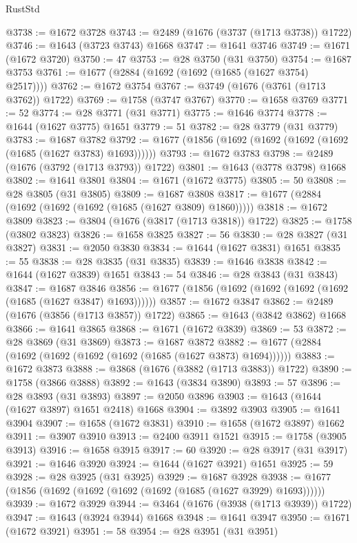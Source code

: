 \begin{lexlean}{RustStd}
\begin{coremodule}
@3738 := @1672 @3728
@3743 := @2489 (@1676 (@3737 (@1713 @3738)) @1722)
@3746 := @1643 (@3723 @3743) @1668
@3747 := @1641 @3746
@3749 := @1671 (@1672 @3720)
@3750 := 47
@3753 := @28 @3750 (@31 @3750)
@3754 := @1687 @3753
@3761 := @1677 (@2884 (@1692 (@1692 (@1685 (@1627 @3754) @2517))))
@3762 := @1672 @3754
@3767 := @3749 (@1676 (@3761 (@1713 @3762)) @1722)
@3769 := @1758 (@3747 @3767)
@3770 := @1658 @3769
@3771 := 52
@3774 := @28 @3771 (@31 @3771)
@3775 := @1646 @3774
@3778 := @1644 (@1627 @3775) @1651
@3779 := 51
@3782 := @28 @3779 (@31 @3779)
@3783 := @1687 @3782
@3792 := @1677 (@1856 (@1692 (@1692 (@1692 (@1692 (@1685 (@1627 @3783) @1693))))))
@3793 := @1672 @3783
@3798 := @2489 (@1676 (@3792 (@1713 @3793)) @1722)
@3801 := @1643 (@3778 @3798) @1668
@3802 := @1641 @3801
@3804 := @1671 (@1672 @3775)
@3805 := 50
@3808 := @28 @3805 (@31 @3805)
@3809 := @1687 @3808
@3817 := @1677 (@2884 (@1692 (@1692 (@1692 (@1685 (@1627 @3809) @1860)))))
@3818 := @1672 @3809
@3823 := @3804 (@1676 (@3817 (@1713 @3818)) @1722)
@3825 := @1758 (@3802 @3823)
@3826 := @1658 @3825
@3827 := 56
@3830 := @28 @3827 (@31 @3827)
@3831 := @2050 @3830
@3834 := @1644 (@1627 @3831) @1651
@3835 := 55
@3838 := @28 @3835 (@31 @3835)
@3839 := @1646 @3838
@3842 := @1644 (@1627 @3839) @1651
@3843 := 54
@3846 := @28 @3843 (@31 @3843)
@3847 := @1687 @3846
@3856 := @1677 (@1856 (@1692 (@1692 (@1692 (@1692 (@1685 (@1627 @3847) @1693))))))
@3857 := @1672 @3847
@3862 := @2489 (@1676 (@3856 (@1713 @3857)) @1722)
@3865 := @1643 (@3842 @3862) @1668
@3866 := @1641 @3865
@3868 := @1671 (@1672 @3839)
@3869 := 53
@3872 := @28 @3869 (@31 @3869)
@3873 := @1687 @3872
@3882 := @1677 (@2884 (@1692 (@1692 (@1692 (@1692 (@1685 (@1627 @3873) @1694))))))
@3883 := @1672 @3873
@3888 := @3868 (@1676 (@3882 (@1713 @3883)) @1722)
@3890 := @1758 (@3866 @3888)
@3892 := @1643 (@3834 @3890)
@3893 := 57
@3896 := @28 @3893 (@31 @3893)
@3897 := @2050 @3896
@3903 := @1643 (@1644 (@1627 @3897) @1651 @2418) @1668
@3904 := @3892 @3903
@3905 := @1641 @3904
@3907 := @1658 (@1672 @3831)
@3910 := @1658 (@1672 @3897) @1662
@3911 := @3907 @3910
@3913 := @2400 @3911 @1521
@3915 := @1758 (@3905 @3913)
@3916 := @1658 @3915
@3917 := 60
@3920 := @28 @3917 (@31 @3917)
@3921 := @1646 @3920
@3924 := @1644 (@1627 @3921) @1651
@3925 := 59
@3928 := @28 @3925 (@31 @3925)
@3929 := @1687 @3928
@3938 := @1677 (@1856 (@1692 (@1692 (@1692 (@1692 (@1685 (@1627 @3929) @1693))))))
@3939 := @1672 @3929
@3944 := @3464 (@1676 (@3938 (@1713 @3939)) @1722)
@3947 := @1643 (@3924 @3944) @1668
@3948 := @1641 @3947
@3950 := @1671 (@1672 @3921)
@3951 := 58
@3954 := @28 @3951 (@31 @3951)

\end{coremodule}
\end{lexlean}
